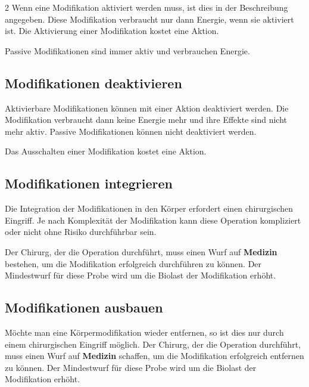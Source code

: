 \begin{multicols}{2}
Wenn eine Modifikation aktiviert werden muss, ist dies in der Beschreibung angegeben. Diese Modifikation verbraucht nur dann Energie, wenn sie aktiviert ist. Die Aktivierung einer Modifikation kostet eine Aktion.

Passive Modifikationen sind immer aktiv und verbrauchen Energie.

\subsection{Modifikationen deaktivieren}

Aktivierbare Modifikationen können mit einer Aktion deaktiviert werden. Die Modifikation verbraucht dann keine Energie mehr und ihre Effekte sind nicht mehr aktiv. Passive Modifikationen können nicht deaktiviert werden.

Das Ausschalten einer Modifikation kostet eine Aktion.

\subsection{Modifikationen integrieren}

Die Integration der Modifikationen in den Körper erfordert einen chirurgischen Eingriff. Je nach Komplexität der Modifikation kann diese Operation kompliziert oder nicht ohne Risiko durchführbar sein.

Der Chirurg, der die Operation durchführt, muss einen Wurf auf \textbf{Medizin} bestehen, um die Modifikation erfolgreich durchführen zu können. Der Mindestwurf für diese Probe wird um die Biolast der Modifikation erhöht.

\subsection{Modifikationen ausbauen}

Möchte man eine Körpermodifikation wieder entfernen, so ist dies nur durch einem chirurgischen Eingriff möglich. Der Chirurg, der die Operation durchführt, muss einen Wurf auf \textbf{Medizin} schaffen, um die Modifikation erfolgreich entfernen zu können. Der Mindestwurf für diese Probe wird um die Biolast der Modifikation erhöht.

\end{multicols}
